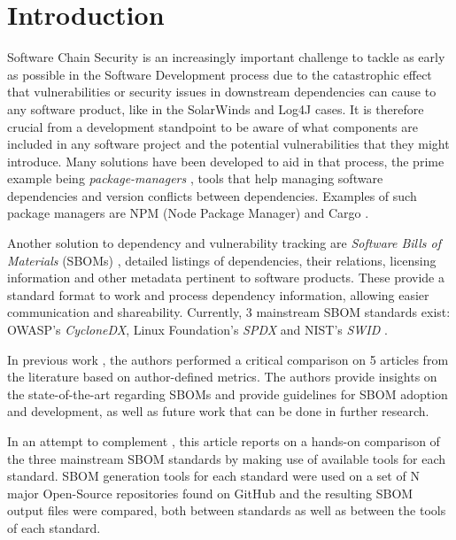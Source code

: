 \section{Introduction}

Software Chain Security is an increasingly important challenge to tackle as early as possible in the Software Development process due to the catastrophic effect that vulnerabilities or security issues in downstream dependencies can cause to any software product, like in the SolarWinds \cite{SolarWinds} and Log4J \cite{logj4} cases. It is therefore crucial from a development standpoint to be aware of what components are included in any software project and the potential vulnerabilities that they might introduce.
Many solutions have been developed to aid in that process, the prime example being \emph{package-managers} \cite{article:package-manager}, tools that help managing software dependencies and version conflicts between dependencies. Examples of such package managers are NPM (Node Package Manager) and Cargo \cite{tools:pkg-mngr:npm,tools:pkg-mngr:cargo}.

Another solution to dependency and vulnerability tracking are \emph{Software Bills of Materials} (SBOMs) \cite{article:concept:sbom-2}, detailed listings of dependencies, their relations, licensing information and other metadata pertinent to software products. These provide a standard format to work and process dependency information, allowing easier communication and shareability.
Currently, 3 mainstream SBOM standards exist: OWASP's \emph{CycloneDX}, Linux Foundation's \emph{SPDX} and NIST's \emph{SWID} \cite{standards:sbom:cyclonedx,standards:sbom:spdx,standards:sbom:swid}.

In previous work \cite{article:concept:sbom-sota-review}, the authors performed a critical comparison on 5 articles from the literature \cite{article:business-sbom,article:software-bom,article:sbom-required,article:sbom-study,article:sboms-issues-solutions} based on author-defined metrics. The authors provide insights on the state-of-the-art regarding SBOMs and provide guidelines for SBOM adoption and development, as well as future work that can be done in further research. 

In an attempt to complement \cite{article:concept:sbom-sota-review}, this article reports on a hands-on comparison of the three mainstream SBOM standards by making use of available tools for each standard. SBOM generation tools for each standard were used on a set of N major Open-Source repositories found on GitHub and the resulting SBOM output files were compared, both between standards as well as between the tools of each standard.
